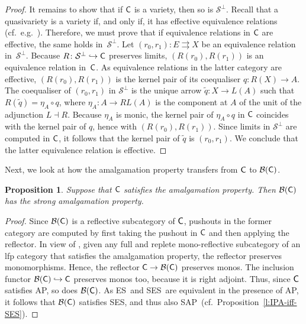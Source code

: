\documentclass[a4paper,10pt,reqno]{amsart}
\newtheorem{proposition}[theorem]{Proposition}
\theoremstyle{definition}
\theoremstyle{remark}
\newcommand{\cat}{{\sf C}}								%
\newcommand{\B}[1]{\mathcal{B}(#1)}						%
\newcommand{\ar}[1]{\mathcal{#1}}							%
\newcommand{\into}{\hookrightarrow}						%
\newcommand{\ort}[1]{{#1}^{\perp}}						%
\newcommand{\ES}{\textnormal{ES}}
\newcommand{\SES}{\textnormal{SES}}
\newcommand{\AP}{\textnormal{AP}}
\newcommand{\SAP}{\textnormal{SAP}}
\begin{document}
\begin{proof}
It remains to show that if $\cat$ is a variety, then so is $\ort{\ar{S}}$. Recall that a quasivariety is a variety if, and only if, it has effective equivalence relations (cf.\ e.g.\ \cite[Corollary~3.25]{ar94book}). Therefore, we must prove that if equivalence relations in $\cat$ are effective, the same holds in~$\ort{\ar{S}}$. Let $(r_{0},r_{1})\colon E\rightrightarrows X$ be an equivalence relation in~$\ort{\ar{S}}$. Because $R\colon \ort{\ar{S}}\into \cat$ preserves limits, $(R(r_{0}),R(r_{1}))$ is an equivalence relation in~$\cat$. As equivalence relations in the latter category are effective, $(R(r_{0}),R(r_{1}))$ is the kernel pair of its coequaliser $q\colon R(X)\to A$. The coequaliser of $(r_{0},r_{1})$ in $\ort{\ar{S}}$ is the unique arrow $\tilde{q}\colon X\to L(A)$ such that $R(\tilde{q}) = \eta_{A}\circ q$, where $\eta_{A}\colon A \to RL(A)$ is the component at $A$ of the unit of the adjunction $L\dashv R$. Because $\eta_{A}$ is monic, the kernel pair of $\eta_{A}\circ q$ in $\cat$ coincides with the kernel pair of $q$, hence with $(R(r_{0}),R(r_{1}))$. Since limits in $\ort{\ar{S}}$ are computed in $\cat$, it follows that the kernel pair of $\tilde{q}$ is $(r_{0},r_{1})$. We conclude that the latter equivalence relation is effective.
\end{proof}

Next, we look at how the amalgamation property transfers from $\cat$ to $\B{\cat}$.

\begin{proposition}\label{p:transfer-AP}
Suppose that $\cat$ satisfies the amalgamation property. Then $\B{\cat}$ has the strong amalgamation property.
\end{proposition}

\begin{proof}
Since $\B{\cat}$ is a reflective subcategory of $\cat$, pushouts in the former category are computed by first taking the pushout in $\cat$ and then applying the reflector. 
In view of \cite[Lemma~1]{Ringel1971}, given any full and replete mono-reflective subcategory of an lfp category that satisfies the amalgamation property, the reflector preserves monomorphisms. Hence, the reflector $\cat\to\B{\cat}$ preserves monos. The inclusion functor $\B{\cat}\into\cat$ preserves monos too, because it is right adjoint. Thus, since $\cat$ satisfies \AP, so does $\B{\cat}$. As \ES~and \SES~are equivalent in the presence of \AP, it follows that $\B{\cat}$ satisfies \SES, and thus also \SAP~(cf.\ Proposition~\ref{l:IPA-iff-SES}).
\end{proof}
\end{document}
